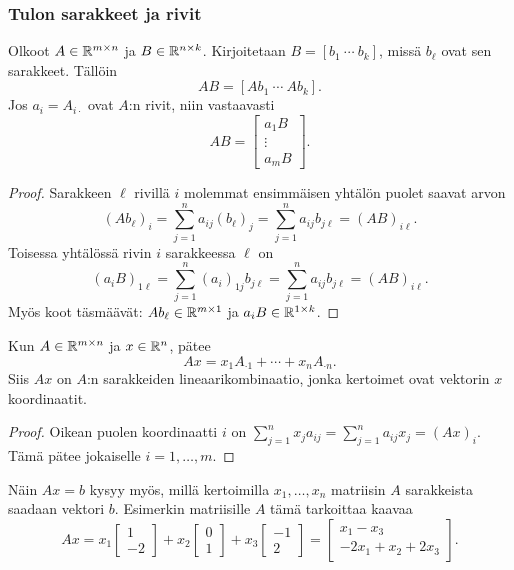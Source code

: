 \documentclass[11pt,a4paper]{amsart}
\begin{document}
  \subsubsection*{Tulon sarakkeet ja rivit}

  \begin{lemma}
    Olkoot $A\in\mathbb{R}^{m\times n}$ ja $B\in\mathbb{R}^{n\times k}$.
    Kirjoitetaan $B=[b_1\ \cdots\ b_k]$, missä $b_\ell$ ovat sen
    sarakkeet. Tällöin
    \[
      \boxed{AB=[Ab_1\ \cdots\ Ab_k].}
    \]
    Jos $a_i=A_{i\cdot}$ ovat $A$:n rivit, niin vastaavasti
    \[
      \boxed{AB=
        \begin{bmatrix}a_1B\\\vdots\\a_mB
      \end{bmatrix}.}
    \]
  \end{lemma}
  \begin{proof}
    Sarakkeen $\ell$ rivillä $i$ molemmat ensimmäisen yhtälön puolet
    saavat arvon
    \[
      (Ab_\ell)_i=\sum_{j=1}^n a_{ij}(b_\ell)_j
      =\sum_{j=1}^n a_{ij}b_{j\ell}=(AB)_{i\ell}.
    \]
    Toisessa yhtälössä rivin $i$ sarakkeessa $\ell$ on
    \[
      (a_iB)_{1\ell}=\sum_{j=1}^n(a_i)_{1j}b_{j\ell}
      =\sum_{j=1}^n a_{ij}b_{j\ell}=(AB)_{i\ell}.
    \]
    Myös koot täsmäävät: $Ab_\ell\in\mathbb{R}^{m\times1}$ ja
    $a_iB\in\mathbb{R}^{1\times k}$.
  \end{proof}

  \begin{lemma}
    Kun $A\in\mathbb{R}^{m\times n}$ ja $x\in\mathbb{R}^n$, pätee
    \[
      \boxed{Ax=x_1A_{\cdot1}+\cdots+x_nA_{\cdot n}.}
    \]
    Siis $Ax$ on $A$:n sarakkeiden lineaarikombinaatio, jonka
    kertoimet ovat vektorin $x$ koordinaatit.
  \end{lemma}
  \begin{proof}
    Oikean puolen koordinaatti $i$ on
    $\sum_{j=1}^n x_ja_{ij}=\sum_{j=1}^n a_{ij}x_j=(Ax)_i$.
    Tämä pätee jokaiselle $i=1,\ldots,m$.
  \end{proof}

  Näin $Ax=b$ kysyy myös, millä kertoimilla $x_1,\ldots,x_n$
  matriisin $A$ sarakkeista saadaan vektori $b$.
  Esimerkin matriisille $A$ tämä tarkoittaa kaavaa
  \[
    Ax=x_1
    \begin{bmatrix}1\\-2
    \end{bmatrix}
    +x_2
    \begin{bmatrix}0\\1
    \end{bmatrix}
    +x_3
    \begin{bmatrix}-1\\2
    \end{bmatrix}
    =
    \begin{bmatrix}x_1-x_3\\-2x_1+x_2+2x_3
    \end{bmatrix}.
  \]
\end{document}
